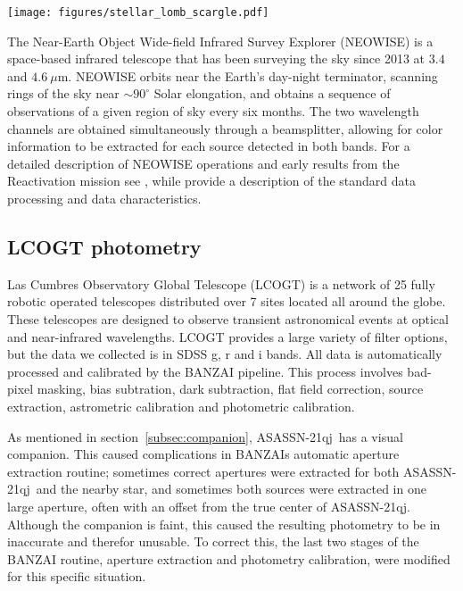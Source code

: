 \documentclass{aa}
\newcommand{\asas}{ASASSN-21qj}
\begin{document}
\begin{figure*}
\begin{centering}
\texttt{[image: figures/stellar\_lomb\_scargle.pdf]}
\caption{ASASSN photometry of \asas\ and the Lomb Scargle periodograms of the photometry in and out of the eclipse.
%
The blue and orange shaded regions in the top panel indicate the range of epochs put into the Lomb Scargle periodogram.
%
Middle panel: The periodograms over a range of 0 to 150 days.
%
Lower panel: The periodogram of the star outside of the eclipse over a range of 0 to 50 days.
}
\label{fig:starlombscargle}
\end{centering}
\end{figure*}
    
The Near-Earth Object Wide-field Infrared Survey Explorer (NEOWISE) is a space-based infrared telescope that has been surveying the sky since 2013 at $3.4$ and $4.6~\mu$m.
%
NEOWISE orbits near the Earth's day-night terminator, scanning rings of the sky near $\sim90^\circ$ Solar elongation, and obtains a sequence of observations of a given region of sky every six months.
%
The two wavelength channels are obtained simultaneously through a beamsplitter, allowing for color information to be extracted for each source detected in both bands.
%
For a detailed description of NEOWISE operations and early results from the Reactivation mission see \citet{mainzer14neowise}, while \citet{cutri15} provide a description of the standard data processing and data characteristics.
%

\subsection{LCOGT photometry}
Las Cumbres Observatory Global Telescope (LCOGT) is a network of 25 fully robotic operated telescopes distributed over 7 sites located all around the globe.
%
These telescopes are designed to observe transient astronomical events at optical and near-infrared wavelengths.
%
LCOGT provides a large variety of filter options, but the data we collected is in SDSS g, r and i bands.
%
All data is automatically processed and calibrated by the BANZAI pipeline.
%
This process involves bad-pixel masking, bias subtration, dark subtraction, flat field correction, source extraction, astrometric calibration and photometric calibration. 

As mentioned in section~\ref{subsec:companion}, \asas\ has a visual companion.
%
This caused complications in BANZAIs automatic aperture extraction routine; sometimes correct apertures were extracted for both \asas\ and the nearby star, and sometimes both sources were extracted in one large aperture, often with an offset from the true center of \asas.
%
Although the companion is faint, this caused the resulting photometry to be in inaccurate and therefor unusable.
%
To correct this, the last two stages of the BANZAI routine, aperture extraction and photometry calibration, were modified for this specific situation.
\end{document}
